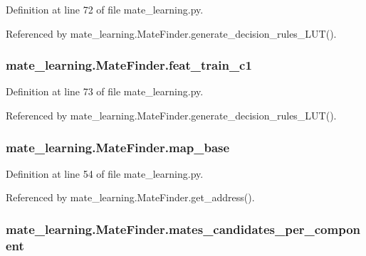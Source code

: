 Definition at line 72 of file mate\+\_\+learning.\+py.



Referenced by mate\+\_\+learning.\+Mate\+Finder.\+generate\+\_\+decision\+\_\+rules\+\_\+\+L\+U\+T().

\hypertarget{classmate__learning_1_1_mate_finder_a9c00a7acd25f415074e73b3d8862d38d}{
\subsubsection[{feat\+\_\+train\+\_\+c1}]{\setlength{\rightskip}{0pt plus 5cm}mate\+\_\+learning.\+Mate\+Finder.\+feat\+\_\+train\+\_\+c1}}\label{classmate__learning_1_1_mate_finder_a9c00a7acd25f415074e73b3d8862d38d}


Definition at line 73 of file mate\+\_\+learning.\+py.



Referenced by mate\+\_\+learning.\+Mate\+Finder.\+generate\+\_\+decision\+\_\+rules\+\_\+\+L\+U\+T().

\hypertarget{classmate__learning_1_1_mate_finder_af4f8fcfed10a8658bf2216f0deab368e}{
\subsubsection[{map\+\_\+base}]{\setlength{\rightskip}{0pt plus 5cm}mate\+\_\+learning.\+Mate\+Finder.\+map\+\_\+base}}\label{classmate__learning_1_1_mate_finder_af4f8fcfed10a8658bf2216f0deab368e}


Definition at line 54 of file mate\+\_\+learning.\+py.



Referenced by mate\+\_\+learning.\+Mate\+Finder.\+get\+\_\+address().

\hypertarget{classmate__learning_1_1_mate_finder_a1feda94256f5a694c6102f83c3fc8ce7}{
\subsubsection[{mates\+\_\+candidates\+\_\+per\+\_\+component}]{\setlength{\rightskip}{0pt plus 5cm}mate\+\_\+learning.\+Mate\+Finder.\+mates\+\_\+candidates\+\_\+per\+\_\+component}}\label{classmate__learning_1_1_mate_finder_a1feda94256f5a694c6102f83c3fc8ce7}


